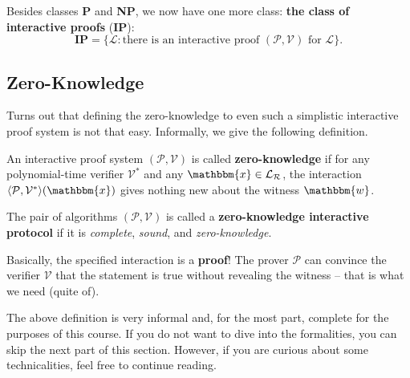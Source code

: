 \documentclass[../lecture-notes-148x210.tex]{subfiles}
\begin{document}
\begin{definition}
    Besides classes \textbf{P} and \textbf{NP}, we now have one more class:
    \textbf{the class of interactive proofs} (\textbf{IP}):
    \begin{equation*}
        \mathbf{IP} = \{\mathcal{L}: \text{there is an interactive proof $(\mathcal{P}, \mathcal{V})$ for $\mathcal{L}$}\}.
    \end{equation*}
\end{definition}

\subsection{Zero-Knowledge}

Turns out that defining the zero-knowledge to even such a simplistic interactive
proof system is not that easy. Informally, we give the following definition.

\begin{definition}
    An interactive proof system $(\mathcal{P}, \mathcal{V})$ is called
    \textbf{zero-knowledge} if for any polynomial-time verifier $\mathcal{V}^*$
    and any $\mathbbm{x} \in \mathcal{L}_{\mathcal{R}}$, the interaction
    $\langle \mathcal{P}, \mathcal{V}^* \rangle(\mathbbm{x})$ gives nothing new
    about the witness $\mathbbm{w}$.
\end{definition}

\begin{definition}
    The pair of algorithms $(\mathcal{P}, \mathcal{V})$ is called a
    \textbf{zero-knowledge interactive protocol} if it is \textit{complete},
    \textit{sound}, and \textit{zero-knowledge}.
\end{definition}

\vspace{-1mm}

Basically, the specified interaction is a \textbf{proof}! The prover
$\mathcal{P}$ can convince the verifier $\mathcal{V}$ that the statement is true
without revealing the witness -- that is what we need (quite of).

\vspace{-1mm}

\begin{remark}
    The above definition is very informal and, for the most part, complete for
    the purposes of this course. If you do not want to dive into the
    formalities, you can skip the next part of this section. However, if you are
    curious about some technicalities, feel free to continue reading.
\end{remark}
\end{document}
